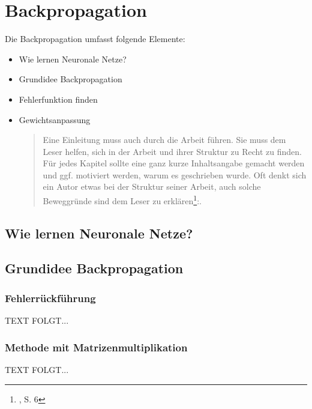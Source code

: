\newpage
\thispagestyle{empty}
\section{Backpropagation}\label{sec:backpropagation}   

\vspace{1cm}
\begin{tcolorbox}[title={Inhalt}]
Die Backpropagation umfasst folgende Elemente:
\begin{itemize}
\item Wie lernen Neuronale Netze?
\item Grundidee Backpropagation
\item Fehlerfunktion finden
\item Gewichtsanpassung
\begin{quotation}
Eine Einleitung muss auch durch die Arbeit führen. Sie muss dem Leser helfen, sich in der Arbeit und ihrer Struktur zu Recht zu finden. Für jedes Kapitel sollte eine ganz kurze Inhaltsangabe gemacht werden und ggf. motiviert werden, warum es geschrieben wurde. Oft denkt sich ein Autor etwas bei der Struktur seiner Arbeit, auch solche Beweggründe sind dem Leser zu erklären\footnote{\cite{BBoJ}, S. 6}:. 
\end{quotation}
\end{itemize}
\end{tcolorbox}

\subsection{Wie lernen Neuronale Netze?}\label{subsec:backpropagation:lernen_nn}

\subsection{Grundidee Backpropagation}\label{subsec:backpropagation:grundiee}
\subsubsection{Fehlerrückführung}\label{subsec:backpropagation:fehlerrueckfuehrung}
  TEXT FOLGT...

\subsubsection{Methode mit Matrizenmultiplikation}\label{subsec:backpropagation:matrizen}
  TEXT FOLGT...

